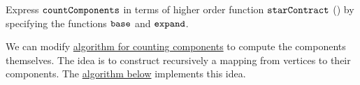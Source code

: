 \begin{exercise}
Express $\texttt{countComponents}$ in terms of higher order function
$\texttt{starContract}$ () by
specifying the functions $\texttt{base}$ and $\texttt{expand}$.
\end{exercise}

\begin{gram}
\label{graphcon::connect::cc-compontents}

%
We can modify 
\href{alg:graphcon::connect::cc}{algorithm for counting components} to compute the components themselves.
%
The idea is to construct recursively a mapping from vertices to their
components. 
%
The 
%
\href{alg:graphcon::connect::nc}{algorithm below} implements this idea.
\end{gram}

